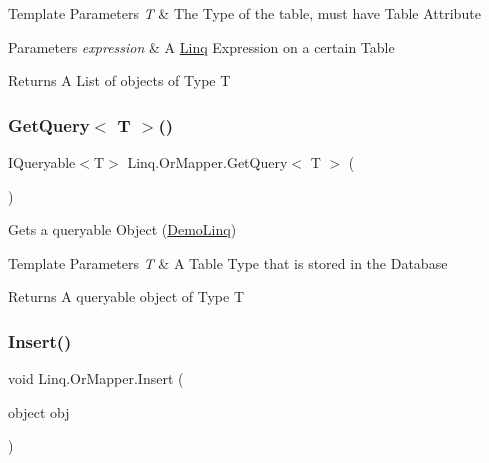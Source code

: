 \begin{DoxyTemplParams}{Template Parameters}
{\em T} & The Type of the table, must have Table Attribute\\
\hline
\end{DoxyTemplParams}

\begin{DoxyParams}{Parameters}
{\em expression} & A \mbox{\hyperlink{namespace_linq}{Linq}} Expression on a certain Table\\
\hline
\end{DoxyParams}
\begin{DoxyReturn}{Returns}
A List of objects of Type T 
\end{DoxyReturn}
\mbox{\label{class_linq_1_1_or_mapper_a61b69ea249addd0ee7c4a3e9e69022ab}} 
\subsubsection{\texorpdfstring{Get\+Query$<$ T $>$()}{GetQuery< T >()}}
{\footnotesize\ttfamily I\+Queryable$<$T$>$ Linq.\+Or\+Mapper.\+Get\+Query$<$ T $>$ (\begin{DoxyParamCaption}{ }\end{DoxyParamCaption})\hspace{0.3cm}{\ttfamily [inline]}}



Gets a queryable Object (\mbox{\hyperlink{class_linq_1_1_demo_linq}{Demo\+Linq}}) 


\begin{DoxyTemplParams}{Template Parameters}
{\em T} & A Table Type that is stored in the Database\\
\hline
\end{DoxyTemplParams}
\begin{DoxyReturn}{Returns}
A queryable object of Type T
\end{DoxyReturn}
\mbox{\label{class_linq_1_1_or_mapper_a77fcb2b43afdc48a72f6356fc063a8c2}} 
\subsubsection{\texorpdfstring{Insert()}{Insert()}}
{\footnotesize\ttfamily void Linq.\+Or\+Mapper.\+Insert (\begin{DoxyParamCaption}\item[{object}]{obj }\end{DoxyParamCaption})\hspace{0.3cm}{\ttfamily [inline]}}



